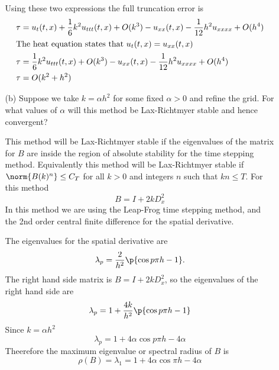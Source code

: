\documentclass[11pt, oneside, titlepage]{article}
\begin{document}
\begin{enumerate}
\begin{enumerate}
                Using these two expressions the full truncation error is
                \begin{align*}
                    \tau &= u_t(t, x) + \frac{1}{6}k^2 u_{ttt}(t, x) + O(k^3) - u_{xx}(t, x) - \frac{1}{12} h^2 u_{xxxx} + O(h^4) \\
                    \intertext{The heat equation states that $u_t(t, x) = u_{xx}(t, x)$}
                    \tau &= \frac{1}{6}k^2 u_{ttt}(t, x) + O(k^3) - u_{xx}(t, x) - \frac{1}{12} h^2 u_{xxxx} + O(h^4) \\
                    \tau &= O(k^2 + h^2)
                \end{align*}

            \item[(b)]
                Suppose we take $k = \alpha h^2$ for some fixed $\alpha > 0$
                and refine the grid.
                For what values of $\alpha$ will this method be Lax-Richtmyer
                stable and hence convergent?

                This method will be Lax-Richtmyer stable if the eigenvalues of
                the matrix for $B$ are inside the region of absolute
                stability for the time stepping method.
                Equivalently this method will be Lax-Richtmyer stable if $\norm{B(k)^n} \le C_T$
                for all $k > 0$ and integers $n$ such that $kn \le T$.
                For this method
                \[
                    B = I + 2k D^2_x
                \]
                In this method we are using the Leap-Frog time stepping method,
                and the 2nd order central finite difference for the spatial derivative.

                The eigenvalues for the spatial derivative are 
                \[
                    \lambda_p = \frac{2}{h^2}\p{\cos{p \pi h} - 1}.
                \]
                The right hand side matrix is $B = I + 2k D^2_x$, so the
                eigenvalues of the right hand side are
                \[
                    \lambda_p = 1 + \frac{4k}{h^2}\p{\cos{p \pi h} - 1}
                \]
                Since $k = \alpha h^2$
                \[
                    \lambda_p = 1 + 4\alpha\cos{p \pi h} - 4\alpha
                \]
                Theerefore the maximum eigenvalue or spectral radius of $B$
                is
                \[
                    \rho(B) = \lambda_1 = 1 + 4\alpha\cos{\pi h} - 4\alpha
                \]


\end{enumerate}
\end{enumerate}
\end{document}
